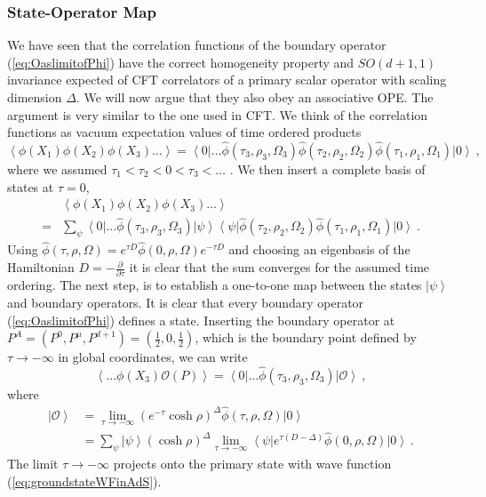 \documentclass{ws-rv9x6}
\newcommand\be{\begin{equation}}
\newcommand\ee{\end{equation}}
\begin{document}
\subsubsection{State-Operator Map}

We have seen that the correlation functions of the boundary operator
(\ref{eq:OaslimitofPhi}) have the correct homogeneity property and
$SO(d+1,1)$ invariance expected of CFT correlators of a primary scalar
operator with scaling dimension $\Delta$. We will now argue that
they also obey an associative OPE. The argument is very similar to
the one used in CFT. We think of the correlation functions as
vacuum expectation values of time ordered products
\be
\left\langle \phi(X_{1})\phi(X_{2})\phi(X_{3})\dots\right\rangle =\left\langle 0\right|\dots\hat{\phi}(\tau_{3},\rho_{3},\Omega_{3})\hat{\phi}(\tau_{2},\rho_{2},\Omega_{2})\hat{\phi}(\tau_{1},\rho_{1},\Omega_{1})\left|0\right\rangle \ , \nonumber
\ee
where we assumed $\tau_{1}<\tau_{2}<0<\tau_{3}<\dots$ . We then insert
a complete basis of states at $\tau=0$,
\begin{align}
&\left\langle \phi(X_{1})\phi(X_{2})\phi(X_{3})\dots\right\rangle \\
=&\sum_{\psi}\left\langle 0\right|\dots\hat{\phi}(\tau_{3},\rho_{3},\Omega_{3})\left|\psi\right\rangle \left\langle \psi\right|\hat{\phi}(\tau_{2},\rho_{2},\Omega_{2})\hat{\phi}(\tau_{1},\rho_{1},\Omega_{1})\left|0\right\rangle \ . \nonumber
\end{align}
Using $\hat{\phi}(\tau,\rho,\Omega)=e^{\tau D}\hat{\phi}(0,\rho,\Omega)e^{-\tau D}$
and choosing an eigenbasis of the Hamiltonian $D=-\frac{\partial}{\partial\tau}$
it is clear that the sum converges for the assumed time ordering.
The next step, is to establish a one-to-one map between the states
$\left|\psi\right\rangle $ and boundary operators. It is clear that
every boundary operator (\ref{eq:OaslimitofPhi}) defines a state.
Inserting the boundary operator at $P^{A}=\left(P^{0},P^{\mu},P^{d+1}\right)=\left(\frac{1}{2},0,\frac{1}{2}\right)$,
which is the boundary point defined by $\tau\to-\infty$ in global
coordinates, we can write 
\be
\left\langle \dots\phi(X_{3})\mathcal{O}(P)\right\rangle =\left\langle 0\right|\dots\hat{\phi}(\tau_{3},\rho_{3},\Omega_{3})\left|\mathcal{O}\right\rangle \ ,
\ee
where
\begin{align}
\left|\mathcal{O}\right\rangle &=\lim_{\tau\to-\infty}\left(e^{-\tau}\cosh\rho\right)^{\Delta}\hat{\phi}(\tau,\rho,\Omega)\left|0\right\rangle \\
&=\sum_{\psi}\left|\psi\right\rangle \left(\cosh\rho\right)^{\Delta}\lim_{\tau\to-\infty}\left\langle \psi\right|e^{\tau(D-\Delta)}\hat{\phi}(0,\rho,\Omega)\left|0\right\rangle \ .\nonumber
\end{align}
The limit $\tau\to-\infty$ projects onto the primary state with wave
function (\ref{eq:groundstateWFinAdS}).
\end{document}
